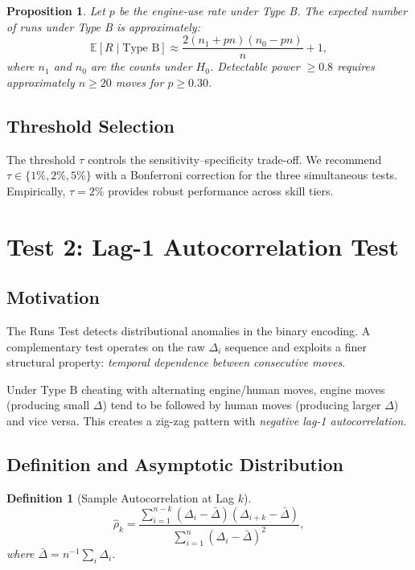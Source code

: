 \documentclass[11pt,a4paper]{article}
\newtheorem{definition}{Definition}
\newtheorem{proposition}{Proposition}
\begin{document}
\begin{proposition}
\label{prop:runs_power}
Let $p$ be the engine-use rate under Type B. The expected number of runs
under Type B is approximately:
\begin{equation}
  \mathbb{E}[R \mid \text{Type B}] \approx
  \frac{2(n_1 + pn)(n_0 - pn)}{n} + 1,
\end{equation}
where $n_1$ and $n_0$ are the counts under $H_0$.
Detectable power $\geq 0.8$ requires approximately $n \geq 20$ moves
for $p \geq 0.30$.
\end{proposition}

\subsection{Threshold Selection}

The threshold $\tau$ controls the sensitivity--specificity trade-off.
We recommend $\tau \in \{1\%, 2\%, 5\%\}$ with a Bonferroni correction
for the three simultaneous tests. Empirically, $\tau = 2\%$ provides
robust performance across skill tiers.

\section{Test 2: Lag-1 Autocorrelation Test}
\label{sec:acf}

\subsection{Motivation}

The Runs Test detects distributional anomalies in the binary encoding.
A complementary test operates on the raw $\Delta_i$ sequence and exploits
a finer structural property: \emph{temporal dependence between consecutive
moves}.

Under Type B cheating with alternating engine/human moves, engine moves
(producing small $\Delta$) tend to be followed by human moves (producing
larger $\Delta$) and vice versa. This creates a zig-zag pattern with
\emph{negative lag-1 autocorrelation}.

\subsection{Definition and Asymptotic Distribution}

\begin{definition}[Sample Autocorrelation at Lag $k$]
\begin{equation}
  \hat{\rho}_k = \frac{\sum_{i=1}^{n-k}(\Delta_i - \bar{\Delta})(\Delta_{i+k} - \bar{\Delta})}
  {\sum_{i=1}^{n}(\Delta_i - \bar{\Delta})^2},
  \label{eq:acf}
\end{equation}
where $\bar{\Delta} = n^{-1}\sum_i \Delta_i$.
\end{definition}
\end{document}
